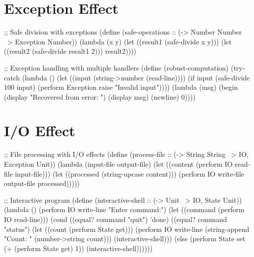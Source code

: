 \section{Exception Effect}
\label{sec:exception-effect}

\begin{example}
\begin{lambdustcode}
;; Safe division with exceptions
(define (safe-operations :: (-> Number Number ~> {Exception} Number))
  (lambda (x y)
    (let ((result1 (safe-divide x y)))
      (let ((result2 (safe-divide result1 2)))
        result2))))

;; Exception handling with multiple handlers
(define (robust-computation)
  (try-catch 
    (lambda () 
      (let ((input (string->number (read-line))))
        (if input
            (safe-divide 100 input)
            (perform Exception raise "Invalid input"))))
    (lambda (msg)
      (begin (display "Recovered from error: ") (display msg) (newline)
             0))))
\end{lambdustcode}
\end{example}

\section{I/O Effect}
\label{sec:io-effect}

\begin{example}
\begin{lambdustcode}
;; File processing with I/O effects
(define (process-file :: (-> String String ~> {IO, Exception} Unit))
  (lambda (input-file output-file)
    (let ((content (perform IO read-file input-file)))
      (let ((processed (string-upcase content)))
        (perform IO write-file output-file processed)))))

;; Interactive program  
(define (interactive-shell :: (-> Unit ~> {IO, State} Unit))
  (lambda ()
    (perform IO write-line "Enter command:")
    (let ((command (perform IO read-line)))
      (cond 
        ((equal? command "quit") 'done)
        ((equal? command "status") 
         (let ((count (perform State get)))
           (perform IO write-line (string-append "Count: " (number->string count)))
           (interactive-shell)))
        (else 
         (perform State set (+ (perform State get) 1))
         (interactive-shell))))))
\end{lambdustcode}
\end{example}

